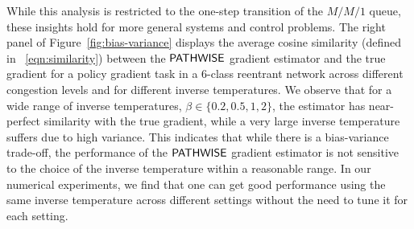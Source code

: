 While this analysis is restricted to the one-step transition of the $M/M/1$ queue, these insights hold for more general systems and control problems. The right panel of Figure~\ref{fig:bias-variance} displays the average cosine similarity (defined in ~\eqref{eqn:similarity}) between the $\mathsf{PATHWISE}$ gradient estimator and the true gradient for a policy gradient task in a 6-class reentrant network across different congestion levels and for different inverse temperatures. We observe that for a wide range of inverse temperatures, $\beta \in \{0.2, 0.5, 1, 2\}$, the estimator has near-perfect similarity with the true gradient, while a very large inverse temperature suffers due to high variance. This indicates that while there is a bias-variance trade-off, the performance of the $\mathsf{PATHWISE}$ gradient estimator is not sensitive to the choice of the inverse temperature within a reasonable range. In our numerical experiments, we %
find that one can get good performance using the same inverse temperature across different settings without the need to tune it for each setting. 


